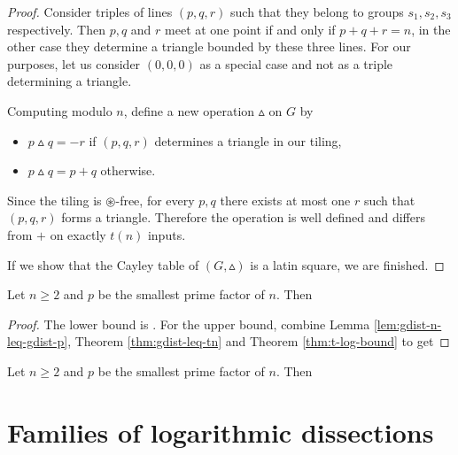 \begin{proof}
Consider triples of lines $(p,q,r)$ such that they belong to groups $s_1,s_2,s_3$ respectively. Then $p, q$ and $r$ meet at one point if and only if $p+q+r=n$, in the other case they determine a triangle bounded by these three lines. For our purposes, let us consider $(0,0,0)$ as a special case and not as a triple determining a triangle.

Computing modulo $n$, define a new operation $\vartriangle$ on $G$ by
\begin{itemize}
	\item $p \vartriangle q = -r$ if $(p,q,r)$ determines a triangle in our tiling,
	\item $p \vartriangle q = p + q$ otherwise.
\end{itemize}
Since the tiling is $\circledast$-free, for every $p,q$ there exists at most one $r$ such that $(p,q,r)$ forms a triangle. Therefore the operation is well defined and differs from $+$ on exactly $t(n)$ inputs.

If we show that the Cayley table of $(G,\vartriangle)$ is a latin square, we are finished. 
\end{proof}


\begin{cor}
\label{cor:conj-proof}
Let $n \geq 2$ and $p$ be the smallest prime factor of $n$. Then
\end{cor}%
\begin{proof}
The lower bound is . For the upper bound, combine Lemma \ref{lem:gdist-n-leq-gdist-p}, Theorem \ref{thm:gdist-leq-tn} and Theorem \ref{thm:t-log-bound} to get
\end{proof}

\begin{cor}
\label{cor:constants}
Let $n \geq 2$ and $p$ be the smallest prime factor of $n$. Then
\end{cor}%


\section{Families of logarithmic dissections}

